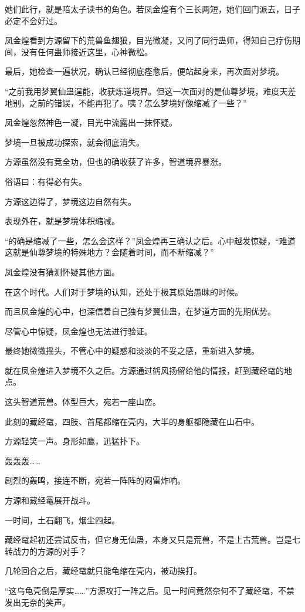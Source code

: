 \begin{this_body}
她们此行，就是陪太子读书的角色。若凤金煌有个三长两短，她们回门派去，日子必定不会好过。

凤金煌看到方源留下的荒兽鱼翅狼，目光微凝，又问了同行蛊师，得知自己疗伤期间，没有任何蛊师接近这里，心神微松。

最后，她检查一遍状况，确认已经彻底痊愈后，便站起身来，再次面对梦境。

“之前我用梦翼仙蛊逞能，收获炼道境界。但这一次面对的是仙尊梦境，难度天差地别，之前的错误，不能再犯了。咦？怎么梦境好像缩减了一些？”

凤金煌忽然神色一凝，目光中流露出一抹怀疑。

梦境一旦被成功探索，就会彻底消失。

方源虽然没有竞全功，但也的确收获了许多，智道境界暴涨。

俗语曰：有得必有失。

方源这边得了，梦境这边自然有失。

表现外在，就是梦境体积缩减。

“的确是缩减了一些，怎么会这样？”凤金煌再三确认之后。心中越发惊疑，“难道这就是仙尊梦境的特殊地方？会随着时间，而不断缩减？”

凤金煌没有猜测怀疑其他方面。

在这个时代。人们对于梦境的认知，还处于极其原始愚昧的时候。

而且凤金煌的心中，也深信着自己独有梦翼仙蛊，在梦道方面的先期优势。

尽管心中惊疑，凤金煌也无法进行验证。

最终她微微摇头，不管心中的疑惑和淡淡的不妥之感，重新进入梦境。

就在凤金煌进入梦境不久之后。方源通过鹤风扬留给他的情报，赶到藏经鼋的地点。

这头智道荒兽。体型巨大，宛若一座山峦。

此刻的藏经鼋，四肢、首尾都缩在壳内，大半的身躯都隐藏在山石中。

方源轻笑一声。身形如鹰，迅猛扑下。

轰轰轰……

剧烈的轰鸣，接连不断，宛若一阵阵的闷雷炸响。

方源和藏经鼋展开战斗。

一时间，土石翻飞，烟尘四起。

藏经鼋起初还尝试反击，但它身无仙蛊，本身又只是荒兽，不是上古荒兽。岂是七转战力的方源的对手？

几轮回合之后，藏经鼋就只能龟缩在壳内，被动挨打。

“这乌龟壳倒是厚实……”方源攻打一阵之后。见一时间竟然奈何不了藏经鼋，不禁发出无奈的笑声。


\end{this_body}
